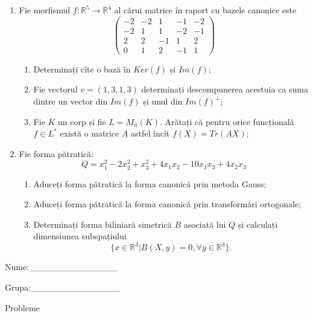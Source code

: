 \documentclass{article}
\begin{document}
\begin{enumerate}
 \item Fie morfismul $f:\mathbb{R}^5 \to \mathbb{R}^4$ al cărui matrice în raport cu bazele canonice este
$$\begin{pmatrix}
-2&-2&1&-1&-2\\
-2&1&1&-2&-1\\
2&2&-1&1&2\\
0&1&2&-1&1
\end{pmatrix}$$

\begin{enumerate}
\item Determinați cîte o bază în $Ker(f)$ și $Im(f)$;
\item Fie vectorul $v=(1,3,1,3)$ determinați descompunerea acestuia ca suma dintre un vector din $Im(f)$ și unul din $Im(f)^\perp$;
\item Fie $K$ un corp și fie $L=M_n(K)$. Arătați că pentru orice funcțională $f \in L^*$ există o matrice $A$ astfel încît $f(X)=Tr(AX)$;
\end{enumerate}
\item Fie forma pătratică:
$$Q= x_1^2-2x_2^2+x_3^2+4x_1x_2-10x_1x_3+4x_2x_3$$

\begin{enumerate}
\item Aduceți forma pătratică la forma canonică prin metoda Gauss;
\item Aduceți forma pătratică la forma canonică prin transformări ortogonale;
\item Determinați forma biliniară simetrică $B$ asociată lui $Q$ și calculați dimensiunea subspațiului
$$\{x \in \mathbb{R}^3 | B(X,y)=0,\forall y \in \mathbb{R}^3\}.$$

\end{enumerate}
\end{enumerate}
\newpage
\begin{flushright}
Nume:\_\_\_\_\_\_\_\_\_\_\_\_\_\_
 
 
Grupa:\_\_\_\_\_\_\_\_\_\_\_\_\_\_
\end{flushright}
\begin{center}
\vspace{2cm}
{\Large Probleme}
\vspace{2cm}
\end{center}
\end{document}
